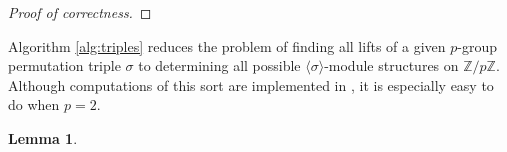 \documentclass{dcthesis}
\newcommand{\PP}{\mathbb P}
\newcommand{\ZZ}{\mathbb Z}
\newcommand{\wt}[1]{\widetilde{#1}}
\DeclareMathOperator{\Lifts}{Lifts}
\numberwithin{equation}{section}
\newtheorem{lemma}[equation]{Lemma}
\theoremstyle{definition}
\theoremstyle{remark}
\newtheorem{remark}[equation]{Remark}
\begin{document}
{{{\begin{proof}[Proof of correctness]
    \end{proof}
    Algorithm \ref{alg:triples}
    reduces the problem of finding all lifts
    of a given $p$-group permutation triple
    $\sigma$ to determining all possible
    $\langle\sigma\rangle$-module
    structures on $\ZZ/p\ZZ$.
    Although computations of this sort
    are implemented
    in \cite{magma},
    it is especially easy to do
    when $p=2$.
    \begin{lemma}

\end{lemma}}}}
\end{document}
